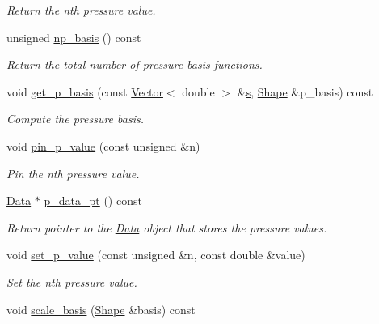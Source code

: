 \begin{DoxyCompactItemize}
\begin{DoxyCompactList}\small\item\em Return the nth pressure value. \end{DoxyCompactList}\item 
unsigned \hyperlink{classoomph_1_1TRaviartThomasDarcyElement_a73c28d7e3789db421c5c5eccc3e25581}{np\+\_\+basis} () const
\begin{DoxyCompactList}\small\item\em Return the total number of pressure basis functions. \end{DoxyCompactList}\item 
void \hyperlink{classoomph_1_1TRaviartThomasDarcyElement_ab28d384f8b0f7c8b6f5c9d2a1b7f44bb}{get\+\_\+p\+\_\+basis} (const \hyperlink{classoomph_1_1Vector}{Vector}$<$ double $>$ \&\hyperlink{cfortran_8h_ab7123126e4885ef647dd9c6e3807a21c}{s}, \hyperlink{classoomph_1_1Shape}{Shape} \&p\+\_\+basis) const
\begin{DoxyCompactList}\small\item\em Compute the pressure basis. \end{DoxyCompactList}\item 
void \hyperlink{classoomph_1_1TRaviartThomasDarcyElement_ae7a875ecb7a63af9ab75051d9f5b1839}{pin\+\_\+p\+\_\+value} (const unsigned \&n)
\begin{DoxyCompactList}\small\item\em Pin the nth pressure value. \end{DoxyCompactList}\item 
\hyperlink{classoomph_1_1Data}{Data} $\ast$ \hyperlink{classoomph_1_1TRaviartThomasDarcyElement_a2cd258057e61232e3e29238faae7d315}{p\+\_\+data\+\_\+pt} () const
\begin{DoxyCompactList}\small\item\em Return pointer to the \hyperlink{classoomph_1_1Data}{Data} object that stores the pressure values. \end{DoxyCompactList}\item 
void \hyperlink{classoomph_1_1TRaviartThomasDarcyElement_a8ea07dc74e56f09716e7d556aee30d01}{set\+\_\+p\+\_\+value} (const unsigned \&n, const double \&value)
\begin{DoxyCompactList}\small\item\em Set the nth pressure value. \end{DoxyCompactList}\item 
void \hyperlink{classoomph_1_1TRaviartThomasDarcyElement_aafe56b344166f0c26889247b80fd76c1}{scale\+\_\+basis} (\hyperlink{classoomph_1_1Shape}{Shape} \&basis) const

\end{DoxyCompactItemize}
